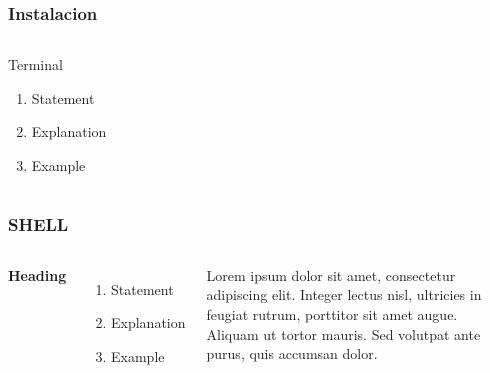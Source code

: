 \documentclass{beamer}
\begin{document}
\begin{frame}
\frametitle{Instalacion}
\begin{columns}[c] %

\begin{block}{Terminal}
\begin{enumerate}
\item Statement
\item Explanation
\item Example
\end{enumerate}
\end{block}


\end{columns}
\end{frame}


\begin{frame}
\frametitle{SHELL}
\begin{columns}[c] %

\textbf{Heading}
\begin{enumerate}
\item Statement
\item Explanation
\item Example
\end{enumerate}

Lorem ipsum dolor sit amet, consectetur adipiscing elit. Integer lectus nisl, ultricies in feugiat rutrum, porttitor sit amet augue. Aliquam ut tortor mauris. Sed volutpat ante purus, quis accumsan dolor.

\end{columns}
\end{frame}
\end{document}
